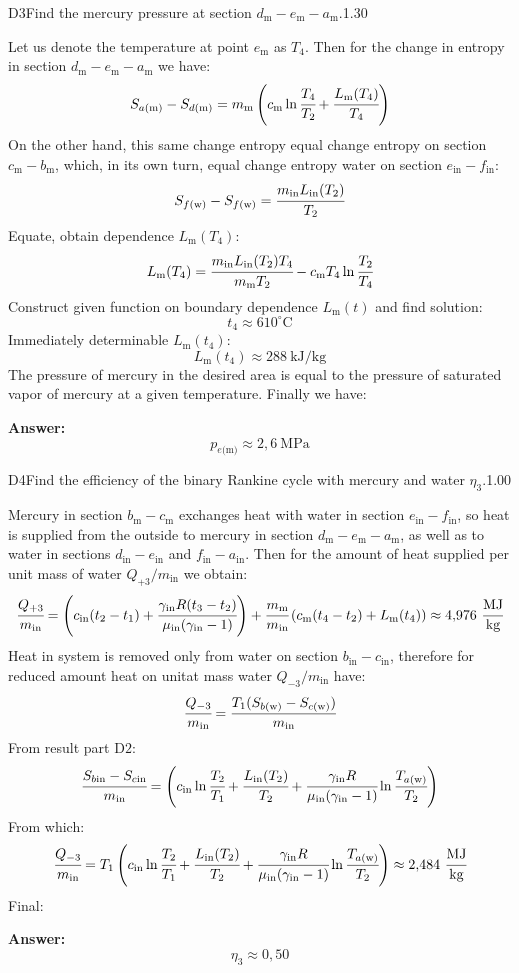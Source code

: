 \documentclass[11pt,a4paper]{article}
\begin{document}
\begin{solcard}{D3}{Find the mercury pressure at section $d_\text{m}-e_\text{m}-a_\text{m}$.}{1.30}

Let us denote the temperature at point $e_\text{m}$ as $T_4$. Then for the change in entropy in section $d_\text{m}-e_\text{m}-a_\text{m}$ we have: $$
S_{a\text{(m)}}-S_{d\text{(m)}}=m_\text{m}\left(c_\text{m}\ln\cfrac{T_4}{T_2}+\cfrac{L_\text{m}(T_4)}{T_4}\right) $$ On the other hand, this same change entropy equal change entropy on section $c_\text{m}-b_\text{m}$, which, in its own turn, equal change entropy water on section $e_\text{in}-f_\text{in}$: $$
S_{f\text{(w)}}-S_{f\text{(w)}}=\cfrac{m_\text{in}L_\text{in}(T_2)}{T_2} $$ Equate, obtain dependence $L_\text{m}(T_4)$: $$
L_\text{m}(T_4)=\cfrac{m_\text{in}L_\text{in}(T_2)T_4}{m_\text{m}T_2}-c_\text{m}T_4\ln\cfrac{T_2}{T_4} $$ Construct given function on boundary dependence $L_\text{m}(t)$ and find solution: $$t_4\approx 610^{\circ}\mathrm{C} $$ Immediately determinable $L_\text{m}(t_4)$: $$
L_\text{m}(t_4)\approx 288~\text{kJ}/\text{kg} $$ The pressure of mercury in the desired area is equal to the pressure of saturated vapor of mercury at a given temperature. Finally we have:

\par\smallskip\noindent\textbf{Answer:} $$p_{e\text{(m)}}\approx 2{,}6~\text{MPa} $$
\end{solcard}

\begin{solcard}{D4}{Find the efficiency of the binary Rankine cycle with mercury and water $\eta_3$.}{1.00}

Mercury in section $b_\text{m}-c_\text{m}$ exchanges heat with water in section $e_\text{in}-f_\text{in}$, so heat is supplied from the outside to mercury in section $d_\text{m}-e_\text{m}-a_\text{m}$, as well as to water in sections $d_\text{in}-e_\text{in}$ and $f_\text{in}-a_\text{in}$. Then for the amount of heat supplied per unit mass of water $Q_{+3}/m_\text{in}$ we obtain: $$\cfrac{Q_{+3}}{m_\text{in}}=\left(c_\text{in}(t_2-t_1)+\cfrac{\gamma_\text{in}R(t_3-t_2)}{\mu_\text{in}(\gamma_\text{in}-1)}\right)+\cfrac{m_\text{m}}{m_\text{in}}\left(c_\text{m}(t_4-t_2)+L_\text{m}(t_4)\right)\approx{4{,}976~\cfrac{\text{MJ}}{\text{kg}}} $$ Heat in system is removed only from water on section $b_\text{in}-c_\text{in}$, therefore for reduced amount heat on unitat mass water $Q_{-3}/m_\text{in}$ have: $$\cfrac{Q_{-3}}{m_\text{in}}=\cfrac{T_1(S_{b\text{(w)}}-S_{c\text{(w)}})}{m_\text{in}} $$ From result part $\mathrm{D2}$: $$\cfrac{S_{b\text{in}}-S_{c\text{in}}}{m_\text{in}}=\left(c_\text{in}\ln\cfrac{T_2}{T_1}+\cfrac{L_\text{in}(T_2)}{T_2}+\cfrac{\gamma_\text{in}R}{\mu_\text{in}(\gamma_\text{in}-1)}\ln\cfrac{T_{a\text{(w)}}}{T_2}\right) $$ From which: $$\cfrac{Q_{-3}}{m_\text{in}}=T_1\left(c_\text{in}\ln\cfrac{T_2}{T_1}+\cfrac{L_\text{in}(T_2)}{T_2}+\cfrac{\gamma_\text{in}R}{\mu_\text{in}(\gamma_\text{in}-1)}\ln\cfrac{T_{a\text{(w)}}}{T_2}\right)\approx{2{,}484~\cfrac{\text{MJ}}{\text{kg}}} $$ Final:

\par\smallskip\noindent\textbf{Answer:} $$\eta_3\approx{0{,}50} $$
\end{solcard}
\end{document}

